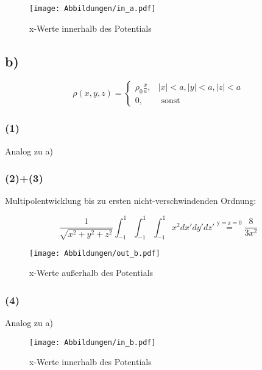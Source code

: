 \begin{figure}[H]
    \centering
    \texttt{[image: Abbildungen/in\_a.pdf]}
    \caption{x-Werte innerhalb des Potentials}
    \label{fig:2a.4}
\end{figure}

\subsection*{b)}

\begin{equation}\rho(x, y, z)=\left\{\begin{array}{ll}
\rho_{0} \frac{x}{a}, & |x|<a,|y|<a,|z|<a \\
0, & \text { sonst }
\end{array}\right.\end{equation}

\subsubsection*{(1)}
Analog zu a)

\subsubsection*{(2)+(3)}
Multipolentwicklung bis zu ersten nicht-verschwindenden Ordnung:

\begin{equation*}
  \frac{1}{\sqrt{x^2+y^2+z^2}} \int_{-1}^1 \int_{-1}^1 \int_{-1}^1 x^2 dx'dy'dz'
  \overset{\mathrm{y=z=0}}{=} \frac{8}{3x^2}
\end{equation*}

\begin{figure}[H]
    \centering
    \texttt{[image: Abbildungen/out\_b.pdf]}
    \caption{x-Werte außerhalb des Potentials}
    \label{fig:2b.2}
\end{figure}

\subsubsection*{(4)}
Analog zu a)

\begin{figure}[H]
    \centering
    \texttt{[image: Abbildungen/in\_b.pdf]}
    \caption{x-Werte innerhalb des Potentials}
    \label{fig:2b.4}
\end{figure}


